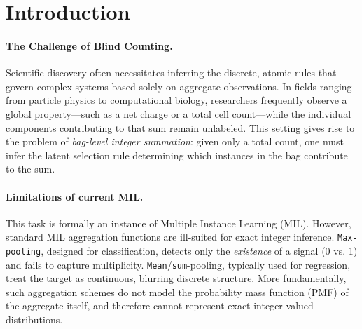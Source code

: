 \documentclass{article}
\theoremstyle{plain}
\theoremstyle{definition}
\theoremstyle{remark}
\begin{document}
\printAffiliationsAndNotice{}  %

\begin{abstract}
    We study \textit{Latent Counting}, where only an aggregate count $Y=\sum_i z_i$ is observed for a bag of unlabeled instances, and the goal is to learn a latent instance-level selection rule that extrapolates to larger, unseen bags.
    Our approach combines a differentiable \textbf{Probabilistic Convolutional Aggregator} that computes the exact probability mass function of $Y$ with a \textbf{Purely-Relative Transformer} that removes absolute features and conditions attention only on learnable pairwise relations.
    We demonstrate our approach on a challenging rule-discovery problem in mathematics, the conjectural $(q,t)$-Littlewood--Richardson formula, achieving $>98\%$ accuracy while extrapolating beyond the training regime.
    More broadly, these results suggest that explicitly modeling integer-valued aggregation can support rule discovery under weak supervision.
\end{abstract}

	\section{Introduction}
	
	\paragraph{The Challenge of Blind Counting.} 
	Scientific discovery often necessitates inferring the discrete, atomic rules that govern complex systems based solely on aggregate observations. In fields ranging from particle physics to computational biology, researchers frequently observe a global property—such as a net charge or a total cell count—while the individual components contributing to that sum remain unlabeled. This setting gives rise to the problem of \textit{bag-level integer summation}: given only a total count, one must infer the latent selection rule determining which instances in the bag contribute to the sum. 
	
	\paragraph{Limitations of current MIL.} 
	This task is formally an instance of Multiple Instance Learning (MIL). However, standard MIL aggregation functions are ill-suited for exact integer inference. 
    \texttt{Max-pooling}, designed for classification, detects only the \textit{existence} of a signal (0 vs. 1) and fails to capture multiplicity.
    \texttt{Mean}/\texttt{sum}-pooling, typically used for regression, treat the target as continuous, blurring discrete structure.
    More fundamentally, such aggregation schemes do not model the probability mass function (PMF) of the aggregate itself, and therefore cannot represent exact integer-valued distributions.
\end{document}
